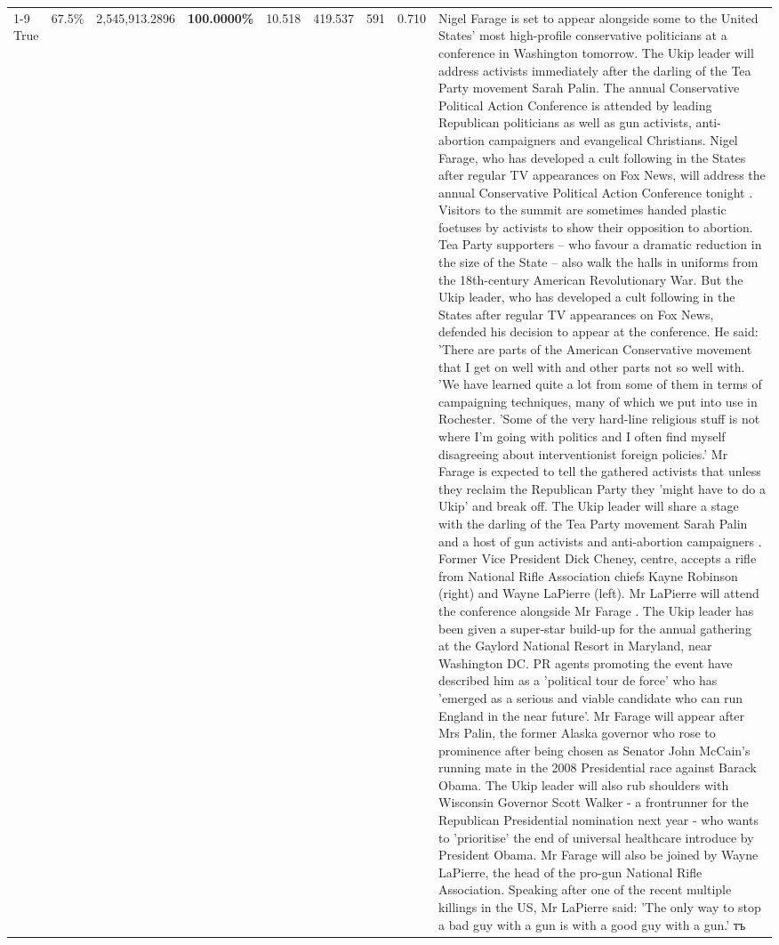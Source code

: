 \begin{table}[H]
\begin{tabular}{lllrlllll}
\cline{1-9}
True & 67.5\% & 2,545,913.2896 & \bfseries \color{red} 100.0000\% & 10.518 & 419.537 & 591 & 0.710 & Nigel Farage is set to appear alongside some to the United States' most high-profile conservative politicians at a conference in Washington tomorrow. The Ukip leader will address activists immediately after the darling of the Tea Party movement Sarah Palin. The annual Conservative Political Action Conference is attended by leading Republican politicians as well as gun activists, anti-abortion campaigners and evangelical Christians. Nigel Farage, who has developed a cult following in the States after regular TV appearances on Fox News, will address the annual Conservative Political Action Conference tonight . Visitors to the summit are sometimes handed plastic foetuses by activists to show their opposition to abortion. Tea Party supporters – who favour a dramatic reduction in the size of the State – also walk the halls in uniforms from the 18th-century American Revolutionary War. But the Ukip leader, who has developed a cult following in the States after regular TV appearances on Fox News, defended his decision to appear at the conference. He said: 'There are parts of the American Conservative movement that I get on well with and other parts not so well with. 'We have learned quite a lot from some of them in terms of campaigning techniques, many of which we put into use in Rochester. 'Some of the very hard-line religious stuff is not where I'm going with politics and I often find myself disagreeing about interventionist foreign policies.' Mr Farage is expected to tell the gathered activists that unless they reclaim the Republican Party they 'might have to do a Ukip' and break off. The Ukip leader will share a stage with the darling of the Tea Party movement Sarah Palin and a host of gun activists and anti-abortion campaigners . Former Vice President Dick Cheney, centre, accepts a rifle from National Rifle Association chiefs Kayne Robinson (right) and Wayne LaPierre (left). Mr LaPierre will attend the conference alongside Mr Farage . The Ukip leader has been given a super-star build-up for the annual gathering at the Gaylord National Resort in Maryland, near Washington DC. PR agents promoting the event have described him as a 'political tour de force' who has 'emerged as a serious and viable candidate who can run England in the near future'. Mr Farage will appear after Mrs Palin, the former Alaska governor who rose to prominence after being chosen as Senator John McCain's running mate in the 2008 Presidential race against Barack Obama. The Ukip leader will also rub shoulders with Wisconsin Governor Scott Walker - a frontrunner for the Republican Presidential nomination next year - who wants to 'prioritise' the end of universal healthcare introduce by President Obama. Mr Farage will also be joined by Wayne LaPierre, the head of the pro-gun National Rifle Association. Speaking after one of the recent multiple killings in the US, Mr LaPierre said: 'The only way to stop a bad guy with a gun is with a good guy with a gun.' тъ \\

\end{tabular}
\end{table}
